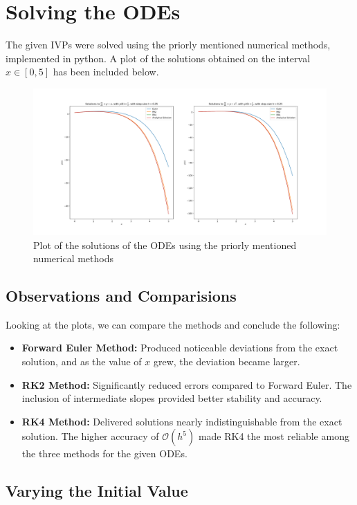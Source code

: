 \documentclass{scrartcl}
\newcommand{\bigO}{\mathcal{O}}
\begin{document}
\section{Solving the ODEs}
The given IVPs were solved using the priorly mentioned numerical methods, implemented in python.
A plot of the solutions obtained on the interval $x \in [0, 5]$ has been included below.
\begin{figure}[h]
    \centering
    \includegraphics[width=\linewidth]{"solutions.png"}
    \caption{Plot of the solutions of the ODEs using the priorly mentioned numerical methods}
\end{figure}
\subsection{Observations and Comparisions}
Looking at the plots, we can compare the methods and conclude the following:
\begin{itemize}
    \item \textbf{Forward Euler Method:} Produced noticeable deviations from the exact solution, and as the value of $x$ grew, the
        deviation became larger.
    \item \textbf{RK2 Method:} Significantly reduced errors compared to Forward Euler. The inclusion of intermediate slopes provided better stability and accuracy.
    \item \textbf{RK4 Method:} Delivered solutions nearly indistinguishable from the exact solution. The higher accuracy of $\bigO(h^5)$ made RK4 the most reliable among the three methods for the given ODEs. 
\end{itemize}
\subsection{Varying the Initial Value}
\end{document}
